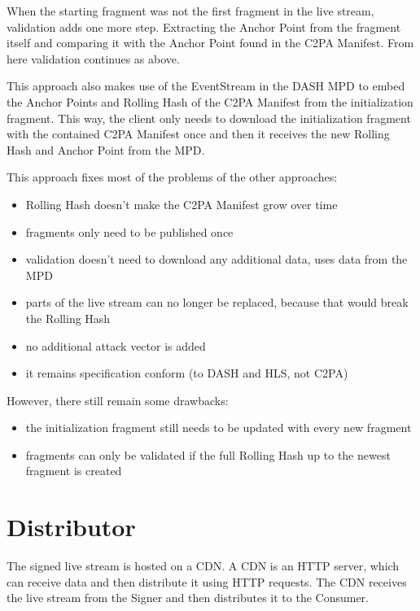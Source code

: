 When the starting fragment was not the first fragment in the live stream, validation adds one more step. Extracting the Anchor Point from the fragment itself and comparing it with the Anchor Point found in the C2PA Manifest. From here validation continues as above.

This approach also makes use of the EventStream in the DASH MPD to embed the Anchor Points and Rolling Hash of the C2PA Manifest from the initialization fragment. This way, the client only needs to download the initialization fragment with the contained C2PA Manifest once and then it receives the new Rolling Hash and Anchor Point from the MPD.

This approach fixes most of the problems of the other approaches:

\begin{itemize}
    \item Rolling Hash doesn't make the C2PA Manifest grow over time
    \item fragments only need to be published once
    \item validation doesn't need to download any additional data, uses data from the MPD
    \item parts of the live stream can no longer be replaced, because that would break the Rolling Hash
    \item no additional attack vector is added
    \item it remains specification conform (to DASH and HLS, not C2PA)
\end{itemize}

However, there still remain some drawbacks:

\begin{itemize}
    \item the initialization fragment still needs to be updated with every new fragment
    \item fragments can only be validated if the full Rolling Hash up to the newest fragment is created
\end{itemize}

\section{Distributor\label{sec:cdn}}

The signed live stream is hosted on a CDN. A CDN is an HTTP server, which can receive data and then distribute it using HTTP requests. The CDN receives the live stream from the Signer and then distributes it to the Consumer.

